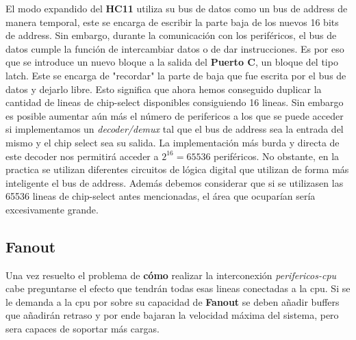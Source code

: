  El modo expandido del \textbf{HC11} utiliza su bus de datos como un bus de address de manera temporal, este se encarga de escribir la parte baja de los nuevos 16 bits de address. Sin embargo, durante la comunicación con los periféricos, el bus de datos cumple la función de intercambiar datos o de dar instrucciones. Es por eso que se introduce un nuevo bloque a la salida del \textbf{Puerto C}, un bloque del tipo latch. Este se encarga de "recordar" la parte de baja que fue escrita por el bus de datos y dejarlo libre.
 Esto significa que ahora hemos conseguido duplicar la cantidad de lineas de chip-select disponibles consiguiendo 16 lineas. 
 Sin embargo es posible aumentar aún más el número de perifericos a los que se puede acceder si implementamos un \textit{decoder/demux} tal que el bus de address sea la entrada del mismo y el chip select sea su salida. La implementación más burda y directa de este decoder nos permitirá acceder a $2^{16} = 65536$ periféricos. No obstante, en la practica se utilizan diferentes circuitos de lógica digital que utilizan de forma más inteligente el bus de address. Además debemos considerar que si se utilizasen las 65536 lineas de chip-select antes mencionadas, el área que ocuparían sería excesivamente grande.
 
\subsection{Fanout}
Una vez resuelto el problema de \textbf{cómo} realizar la interconexión \textit{perifericos-cpu} cabe preguntarse el efecto que tendrán todas esas lineas conectadas a la cpu. Si se le demanda a la cpu por sobre su capacidad de \textbf{Fanout} se deben añadir buffers que añadirán retraso y por ende bajaran la velocidad máxima del sistema, pero sera capaces de soportar más cargas.

